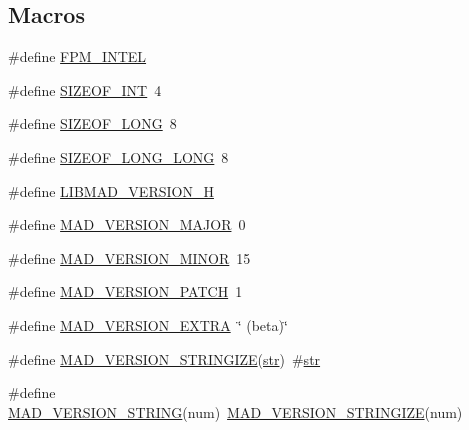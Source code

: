 \subsection*{Macros}
\begin{DoxyCompactItemize}
\item 
\#define \hyperlink{mac_2config_2i386_2lib-src_2libmad_2mad_8h_ac451994561cb3d439255059cff259057}{F\+P\+M\+\_\+\+I\+N\+T\+EL}
\item 
\#define \hyperlink{mac_2config_2i386_2lib-src_2libmad_2mad_8h_a44184cf844a916eee78598ab35fc966b}{S\+I\+Z\+E\+O\+F\+\_\+\+I\+NT}~4
\item 
\#define \hyperlink{mac_2config_2i386_2lib-src_2libmad_2mad_8h_a22aece5d034fd9040a3d01c3797fdfe7}{S\+I\+Z\+E\+O\+F\+\_\+\+L\+O\+NG}~8
\item 
\#define \hyperlink{mac_2config_2i386_2lib-src_2libmad_2mad_8h_acd1ddb89a6f7f17d1c152499173c3eef}{S\+I\+Z\+E\+O\+F\+\_\+\+L\+O\+N\+G\+\_\+\+L\+O\+NG}~8
\item 
\#define \hyperlink{mac_2config_2i386_2lib-src_2libmad_2mad_8h_ac7a67538f7cde81264037f2df80bf5ef}{L\+I\+B\+M\+A\+D\+\_\+\+V\+E\+R\+S\+I\+O\+N\+\_\+H}
\item 
\#define \hyperlink{mac_2config_2i386_2lib-src_2libmad_2mad_8h_a046f223d5458612e4227d402021ada6a}{M\+A\+D\+\_\+\+V\+E\+R\+S\+I\+O\+N\+\_\+\+M\+A\+J\+OR}~0
\item 
\#define \hyperlink{mac_2config_2i386_2lib-src_2libmad_2mad_8h_a6ce409f82a14d731eec40d2ee92a3b15}{M\+A\+D\+\_\+\+V\+E\+R\+S\+I\+O\+N\+\_\+\+M\+I\+N\+OR}~15
\item 
\#define \hyperlink{mac_2config_2i386_2lib-src_2libmad_2mad_8h_a41cada8d90ad1ca4f2ffd7d32d41b955}{M\+A\+D\+\_\+\+V\+E\+R\+S\+I\+O\+N\+\_\+\+P\+A\+T\+CH}~1
\item 
\#define \hyperlink{mac_2config_2i386_2lib-src_2libmad_2mad_8h_a4c77fa2bdf2db7ef43ae26203d8e01c7}{M\+A\+D\+\_\+\+V\+E\+R\+S\+I\+O\+N\+\_\+\+E\+X\+T\+RA}~\char`\"{} (beta)\char`\"{}
\item 
\#define \hyperlink{mac_2config_2i386_2lib-src_2libmad_2mad_8h_ac04935c11ed1c4151154bdbcb5a24065}{M\+A\+D\+\_\+\+V\+E\+R\+S\+I\+O\+N\+\_\+\+S\+T\+R\+I\+N\+G\+I\+ZE}(\hyperlink{sndfile__save_8m_a4b99ff73a8a869319570237b5c57ab03}{str})~\#\hyperlink{sndfile__save_8m_a4b99ff73a8a869319570237b5c57ab03}{str}
\item 
\#define \hyperlink{mac_2config_2i386_2lib-src_2libmad_2mad_8h_a6f4807e25002fd13a45907150769ded9}{M\+A\+D\+\_\+\+V\+E\+R\+S\+I\+O\+N\+\_\+\+S\+T\+R\+I\+NG}(num)~\hyperlink{mac_2config_2i386_2lib-src_2libmad_2mad_8h_ac04935c11ed1c4151154bdbcb5a24065}{M\+A\+D\+\_\+\+V\+E\+R\+S\+I\+O\+N\+\_\+\+S\+T\+R\+I\+N\+G\+I\+ZE}(num)

\end{DoxyCompactItemize}
